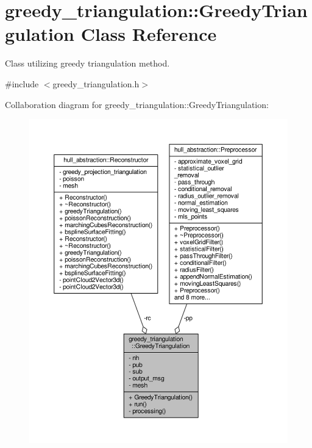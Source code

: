 \hypertarget{classgreedy__triangulation_1_1_greedy_triangulation}{}\section{greedy\+\_\+triangulation\+:\+:Greedy\+Triangulation Class Reference}
\label{classgreedy__triangulation_1_1_greedy_triangulation}


Class utilizing greedy triangulation method.  




{\ttfamily \#include $<$greedy\+\_\+triangulation.\+h$>$}



Collaboration diagram for greedy\+\_\+triangulation\+:\+:Greedy\+Triangulation\+:\nopagebreak
\begin{figure}[H]
\begin{center}
\leavevmode
\includegraphics[width=350pt]{classgreedy__triangulation_1_1_greedy_triangulation__coll__graph}
\end{center}
\end{figure}
